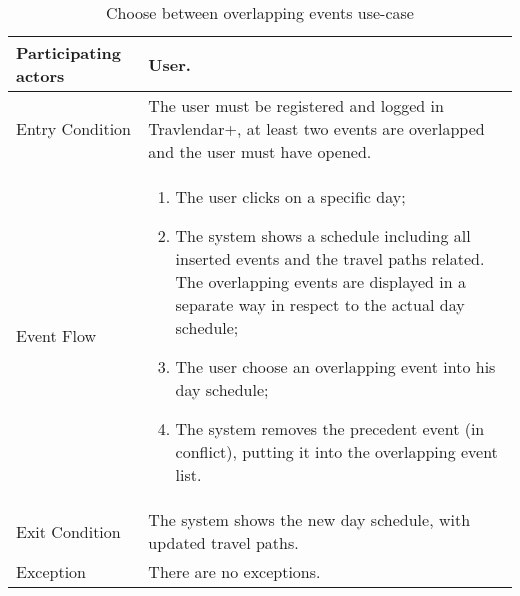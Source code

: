 \begin{table}[H]
	\begin{center}
		\begin{tabular}{ | p{} | p{} | }
		\hline
		Participating actors & User.\\
		\hline
		Entry Condition & The user must be registered and logged in Travlendar+, at least two events are overlapped and the user must have opened.\\
		\hline
		Event Flow & 
			\begin{enumerate}
				\item The user clicks on a specific day;
				\item The system shows a schedule including all inserted events and the travel paths related. The overlapping events are displayed in a separate way in respect to the actual day schedule;
				\item The user choose an overlapping event into his day schedule;
				\item The system removes the precedent event (in conflict), putting it into the overlapping event list.
			\end{enumerate} \\
		\hline
		Exit Condition & The system shows the new day schedule, with updated travel paths. \\
		\hline
		Exception & There are no exceptions.\\ 
		\hline
		\end{tabular}
	\end{center}
	\caption{Choose between overlapping events use-case}
\end{table}